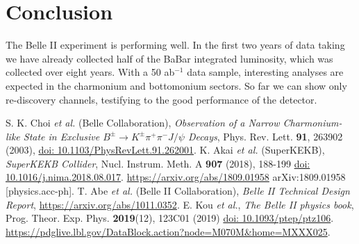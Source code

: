 \documentclass[border=2mm]{article}
\newcommand*{\doi}[1]{\href{http://dx.doi.org/#1}{doi: #1}}
\begin{document}
\section{Conclusion}
The Belle II experiment is performing well. In the first two years of data taking we have already collected half of the BaBar integrated luminosity, which was collected  over eight years.
With a 50 ab$^{-1}$ data sample, interesting analyses are expected in the charmonium and
bottomonium sectors. So far we can show only re-discovery channels, testifying to the good performance of the detector.  






\begin{thebibliography}{99}
 S. K. Choi {\it et al.} (Belle Collaboration), {\it Observation of a Narrow Charmonium-like State in Exclusive $B^{\pm}\to K^{\pm}\pi^{+}\pi^{-}J/\psi$ Decays},
  Phys. Rev. Lett. {\bf 91}, 263902 (2003), \doi{10.1103/PhysRevLett.91.262001}.
 K. Akai {\it et al.} (SuperKEKB), {\it SuperKEKB  Collider}, Nucl. Instrum. Meth. A {\bf 907} (2018), 188-199 \doi{10.1016/j.nima.2018.08.017}.
  \url{https://arxiv.org/abs/1809.01958} arXiv:1809.01958 [physics.acc-ph].
 T. Abe {\it et al.} (Belle II Collaboration), {\it Belle II Technical Design Report}, \url{https://arxiv.org/abs/1011.0352}.
 E. Kou {\it et al.}, {\it The Belle II physics book}, Prog. Theor. Exp. Phys. {\bf 2019}(12), 123C01 (2019) \doi{10.1093/ptep/ptz106}.
 \url{https://pdglive.lbl.gov/DataBlock.action?node=M070M&home=MXXX025}.
\end{thebibliography}

%

\end{document}

